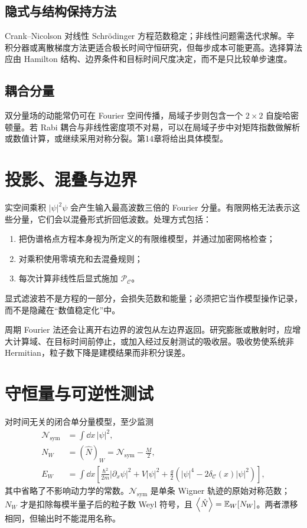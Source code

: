 \subsection{隐式与结构保持方法}

Crank--Nicolson 对线性 Schr\"odinger 方程范数稳定；非线性问题需迭代求解。辛积分器或离散梯度方法更适合极长时间守恒研究，但每步成本可能更高。选择算法应由 Hamilton 结构、边界条件和目标时间尺度决定，而不是只比较单步速度。

\subsection{耦合分量}

双分量场的动能常仍可在 Fourier 空间传播，局域子步则包含一个 $2\times2$ 自旋哈密顿量。若 Rabi 耦合与非线性密度项不对易，可以在局域子步中对矩阵指数做解析或数值计算，或继续采用对称分裂。第14章将给出具体模型。

\section{投影、混叠与边界}

实空间乘积 $|\psi|^2\psi$ 会产生输入最高波数三倍的 Fourier 分量。有限网格无法表示这些分量，它们会以混叠形式折回低波数。处理方式包括：
\begin{enumerate}
  \item 把伪谱格点方程本身视为所定义的有限维模型，并通过加密网格检查；
  \item 对乘积使用零填充和去混叠规则；
  \item 每次计算非线性后显式施加 $\mathcal P_{\mathcal C}$。
\end{enumerate}
显式滤波若不是方程的一部分，会损失范数和能量；必须把它当作模型操作记录，而不是隐藏在“数值稳定化”中。

周期 Fourier 法还会让离开右边界的波包从左边界返回。研究膨胀或散射时，应增大计算域、在目标时间前停止，或加入经过反射测试的吸收层。吸收势使系统非 Hermitian，粒子数下降是建模结果而非积分误差。

\section{守恒量与可逆性测试}

对时间无关的闭合单分量模型，至少监测
\begin{align}
  \mathcal N_{\mathrm{sym}}&=\int\dd x\,|\psi|^2,\\
  N_W&=(\hat N)_W=\mathcal N_{\mathrm{sym}}-\frac M2,\\
  E_W&=\int\dd x\left[
  \frac{\hbar^2}{2m}|\partial_x\psi|^2+V|\psi|^2
  +\frac{g}{2}\left(|\psi|^4-2\delta_{\mathcal C}(x)|\psi|^2\right)
  \right],
  \label{eq:propagation-weyl-energy}
\end{align}
其中省略了不影响动力学的常数。$\mathcal N_{\mathrm{sym}}$ 是单条 Wigner
轨迹的原始对称范数；$N_W$ 才是扣除每模半量子后的粒子数 Weyl 符号，且
$\left\langle \hat N\right\rangle=\mathbb{E}_{W}\!\left[N_W\right]$。两者漂移相同，但输出时不能混用名称。


